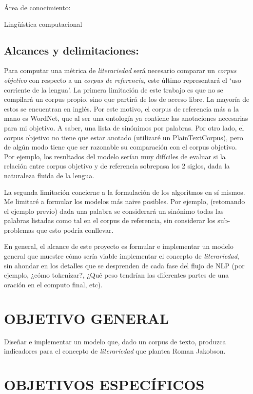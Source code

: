 \documentclass[twoside]{article}
\begin{document}
Área de conocimiento:

Lingüística computacional

\subsection{Alcances y delimitaciones:}
\label{sec:org719457e}

Para computar una métrica de \emph{literariedad} será necesario comparar
un \emph{corpus objetivo} con respecto a un \emph{corpus de referencia,} este
último representará el ‘uso corriente de la lengua'. La primera
limitación de este trabajo es que no se compilará un corpus propio, sino
que partirá de los de acceso libre. La mayoría de estos se encuentran en
inglés. Por este motivo, el corpus de referencia más a la mano es
WordNet, que al ser una ontología ya contiene las anotaciones necesarias
para mi objetivo. A saber, una lista de sinónimos por palabras. Por otro
lado, el corpus objetivo no tiene que estar anotado (utilizaré un
PlainTextCorpus), pero de algún modo tiene que ser razonable su
comparación con el corpus objetivo. Por ejemplo, los resultados del
modelo serían muy difíciles de evaluar si la relación entre corpus
objetivo y de referencia sobrepasa los 2 siglos, dada la naturaleza
fluida de la lengua.

La segunda limitación concierne a la formulación de los algoritmos en sí
mismos. Me limitaré a formular los modelos más naive posibles. Por
ejemplo, (retomando el ejemplo previo) dada una palabra se considerará
un sinónimo todas las palabras listadas como tal en el corpus de
referencia, sin considerar los sub-problemas que esto podría conllevar.

En general, el alcance de este proyecto es formular e implementar un
modelo general que muestre cómo sería viable implementar el concepto de
\emph{literariedad}, sin ahondar en los detalles que se desprenden de cada
fase del flujo de NLP (por ejemplo, ¿cómo tokenizar?, ¿Qué peso tendrían
las diferentes partes de una oración en el computo final, etc).

\section{OBJETIVO GENERAL}
\label{sec:orgc90baf5}
Diseñar e implementar un modelo que, dado un corpus de texto, produzca
indicadores para el concepto de \emph{literariedad} que plantea Roman Jakobson.

\section{OBJETIVOS ESPECÍFICOS}
\label{sec:org9d0d9b1}
\end{document}
